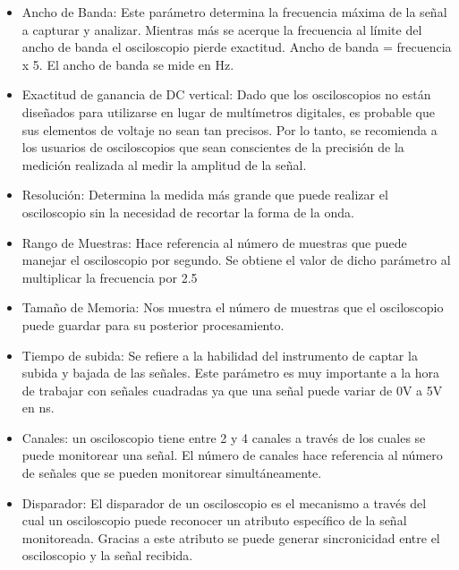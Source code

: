 \begin{itemize}
	\item Ancho de Banda: Este parámetro determina la frecuencia máxima de la señal a capturar y analizar. Mientras más se acerque la frecuencia al límite del ancho de banda el osciloscopio pierde exactitud. Ancho de banda = frecuencia x 5. El ancho de banda se mide en Hz.
	\item Exactitud de ganancia de DC vertical:  Dado que los osciloscopios no están diseñados para utilizarse en lugar de multímetros digitales, es probable que sus elementos de voltaje no sean tan precisos. Por lo tanto, se recomienda a los usuarios de osciloscopios que sean conscientes de la precisión de la medición realizada al medir la amplitud de la señal.
	\item Resolución: Determina la medida más grande que puede realizar el osciloscopio sin la necesidad de recortar la forma de la onda.
	\item Rango de Muestras: Hace referencia al número de muestras que puede manejar el osciloscopio por segundo. Se obtiene el valor de dicho parámetro al multiplicar la frecuencia por 2.5
	\item Tamaño de Memoria: Nos muestra el número de muestras que el osciloscopio puede guardar para su posterior procesamiento.
	\item Tiempo de subida: Se refiere a la habilidad del instrumento de captar la subida y bajada de las señales. Este parámetro es muy importante a la hora de trabajar con señales cuadradas ya que una señal puede variar de 0V a 5V en ns.
	\item Canales: un osciloscopio tiene entre 2 y 4 canales a través de los cuales se puede monitorear una señal. El número de canales hace referencia al número de señales que se pueden monitorear simultáneamente.
	\item Disparador: El disparador de un osciloscopio es el mecanismo a través del cual un osciloscopio puede reconocer un atributo específico de la señal monitoreada. Gracias a este atributo se puede generar sincronicidad entre el osciloscopio y la señal recibida.
\end{itemize}

